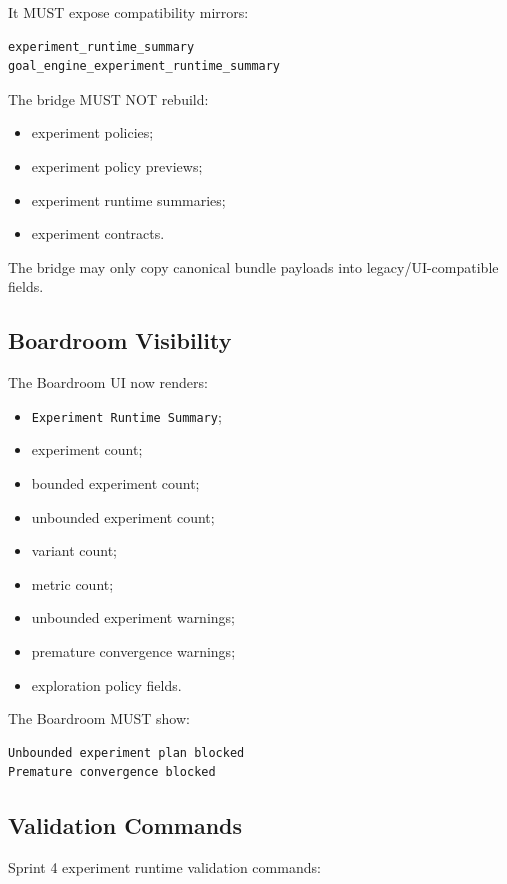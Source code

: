 It MUST expose compatibility mirrors:

\begin{verbatim}
experiment_runtime_summary
goal_engine_experiment_runtime_summary
\end{verbatim}

The bridge MUST NOT rebuild:

\begin{itemize}
  \item experiment policies;
  \item experiment policy previews;
  \item experiment runtime summaries;
  \item experiment contracts.
\end{itemize}

The bridge may only copy canonical bundle payloads into legacy/UI-compatible fields.

\subsection{Boardroom Visibility}

The Boardroom UI now renders:

\begin{itemize}
  \item \texttt{Experiment Runtime Summary};
  \item experiment count;
  \item bounded experiment count;
  \item unbounded experiment count;
  \item variant count;
  \item metric count;
  \item unbounded experiment warnings;
  \item premature convergence warnings;
  \item exploration policy fields.
\end{itemize}

The Boardroom MUST show:

\begin{verbatim}
Unbounded experiment plan blocked
Premature convergence blocked
\end{verbatim}

\subsection{Validation Commands}

Sprint 4 experiment runtime validation commands:

